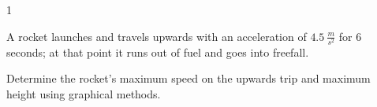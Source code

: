 
\AddToShipoutPicture*{\BackgroundPic}

\addtocounter {ProbNum} {1}

 
{\bf \Large{}} A rocket launches and travels upwards with an acceleration of ${4.5~\tfrac{m}{s^2}}$ for 6 seconds; at that point it runs out of fuel and goes into freefall.   \bigskip

Determine the rocket's maximum speed on the upwards trip and maximum height using graphical methods.  \vfill




\newpage